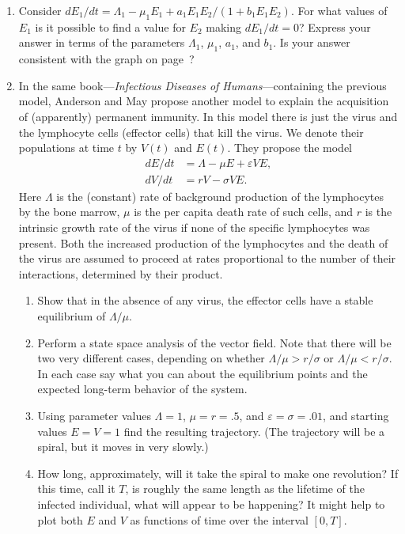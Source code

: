 \begin{enumerate}
\item Consider $dE_1/dt=\Lambda_1-\mu_1E_1+a_1E_1E_2/(1+b_1E_1E_2)$.
For what values of $E_1$ is it possible to find a value for $E_2$
making $dE_1/dt=0$?  Express your answer in terms of the parameters
$\Lambda_1$, $\mu_1$, $a_1$, and $b_1$.  Is your answer consistent
with the graph on page~\pageref{`amprob'}?


\item In\label{AMay2} the same book---{\em Infectious Diseases of
  Humans}---containing the previous model, Anderson and May propose
another model to explain the acquisition of (apparently) permanent
immunity.  In this model there is just the virus and the lymphocyte
cells (effector cells) that kill the virus.  We denote their
populations at time $t$ by $V(t)$ and $E(t)$.  They propose the model
\begin{align*}
dE/dt &= \Lambda-\mu E +\varepsilon VE, \\
dV/dt &= rV-\sigma VE.
\end{align*}
Here $\Lambda$ is the (constant) rate of background production of the
lymphocytes by the bone marrow, $\mu$ is the per capita death rate of
such cells, and $r$ is the intrinsic growth rate of the virus if none
of the specific lymphocytes was present.  Both the increased
production of the lymphocytes and the death of the virus are assumed
to proceed at rates proportional to the number of their interactions,
determined by their product.

  \begin{enumerate}
  \item Show that in the absence of any virus, the effector cells have a
stable equilibrium of $\Lambda /\mu$.

  \item Perform a state space analysis of the vector field.  Note that
there will be two very different cases, depending on whether $\Lambda
/\mu>r/\sigma$ or $\Lambda /\mu<r/\sigma$.  In each case say what you
can about the equilibrium points and the expected long-term behavior
of the system.

  \item Using parameter values $\Lambda=1$, $\mu=r=.5$, and
$\varepsilon=\sigma=.01$, and starting values $E=V=1$ find the
resulting trajectory. (The trajectory will be a spiral, but it moves
in very slowly.)


  \item How long, approximately, will it take the spiral to make one
revolution? If this time, call it $T$, is roughly the same length as
the lifetime of the infected individual, what will appear to be
happening?  It might help to plot both $E$ and $V$ as functions of
time over the interval $[0,T]$.



\end{enumerate}
\end{enumerate}
